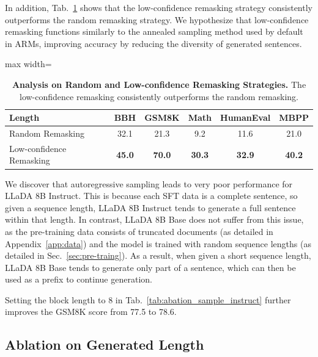 \documentclass{article}
\begin{document}
In addition, Tab.~\ref{tab:ablation-remasking} shows that the low-confidence remasking strategy consistently outperforms the random remasking strategy. We hypothesize that low-confidence remasking functions similarly to the annealed sampling method used by default in ARMs, improving accuracy by reducing the diversity of generated sentences.

\begin{table}[t!]
    \centering
    \caption{\textbf{Analysis on Random and Low-confidence Remasking Strategies.} The low-confidence remasking consistently outperforms the random remasking.}
    \label{tab:ablation-remasking}
    \vspace{.2cm}
    \begin{adjustbox}{max width=\textwidth}
    \begin{tabular}{lccccc}
      \toprule
         Length & BBH & GSM8K & Math & HumanEval & MBPP \\
         \midrule
        Random Remasking & 32.1 &21.3 & 9.2 &11.6 & 21.0\\
        Low-confidence Remasking & \textbf{45.0} & \textbf{70.0} & \textbf{30.3} & \textbf{32.9} & \textbf{40.2}\\
      \bottomrule
    \end{tabular}
    \end{adjustbox}
    \vspace{-.2cm}
\end{table}

We discover that autoregressive sampling leads to very poor performance for LLaDA 8B Instruct. This is because each SFT data is a complete sentence, so given a sequence length, LLaDA 8B Instruct tends to generate a full sentence within that length. In contrast, LLaDA 8B Base does not suffer from this issue, as the pre-training data consists of truncated documents (as detailed in Appendix~\ref{app:data}) and the model is trained with random sequence lengths (as detailed in Sec.~\ref{sec:pre-traing}). As a result, when given a short sequence length, LLaDA 8B Base tends to generate only part of a sentence, which can then be used as a prefix to continue generation.

Setting the block length to 8 in Tab.~\ref{tab:abation_sample_instruct} further improves the GSM8K score from 77.5 to 78.6.



\subsection{Ablation on Generated Length}
\label{app:ablation-length}
\end{document}
